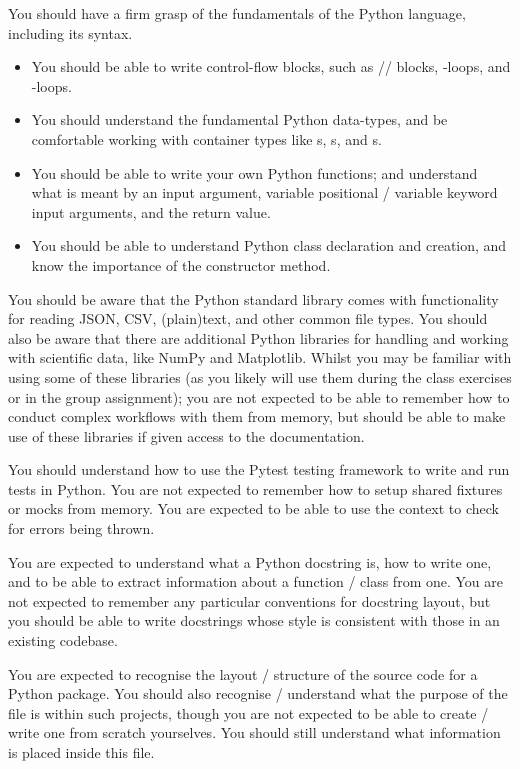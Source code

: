 You should have a firm grasp of the fundamentals of the Python language, including its syntax.

\begin{itemize}
  \item You should be able to write control-flow blocks, such as // blocks, -loops, and -loops.
  \item You should understand the fundamental Python data-types, and be comfortable working with container types like s, s, and s.
  \item You should be able to write your own Python functions; and understand what is meant by an input argument, variable positional / variable keyword input arguments, and the return value.
  \item You should be able to understand Python class declaration and creation, and know the importance of the  constructor method.
\end{itemize}

You should be aware that the Python standard library comes with functionality for reading JSON, CSV, (plain)text, and other common file types.
You should also be aware that there are additional Python libraries for handling and working with scientific data, like NumPy and Matplotlib.
Whilst you may be familiar with using some of these libraries (as you likely will use them during the class exercises or in the group assignment); you are not expected to be able to remember how to conduct complex workflows with them from memory, but should be able to make use of these libraries if given access to the documentation.

You should understand how to use the Pytest testing framework to write and run tests in Python.
You are not expected to remember how to setup shared fixtures or mocks from memory.
You are expected to be able to use the  context to check for errors being thrown.

You are expected to understand what a Python docstring is, how to write one, and to be able to extract information about a function / class from one.
You are not expected to remember any particular conventions for docstring layout, but you should be able to write docstrings whose style is consistent with those in an existing codebase.

You are expected to recognise the layout / structure of the source code for a Python package.
You should also recognise / understand what the purpose of the  file is within such projects, though you are not expected to be able to create / write one from scratch yourselves.
You should still understand what information is placed inside this file.

